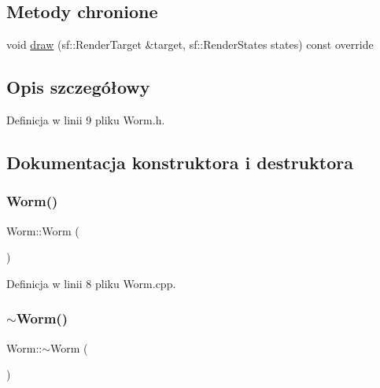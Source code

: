 \subsection*{Metody chronione}
\begin{DoxyCompactItemize}
\item 
void \mbox{\hyperlink{class_worm_adc9fd6dc3b770d4feada327666f31ee3}{draw}} (sf\+::\+Render\+Target \&target, sf\+::\+Render\+States states) const override
\end{DoxyCompactItemize}


\subsection{Opis szczegółowy}


Definicja w linii 9 pliku Worm.\+h.



\subsection{Dokumentacja konstruktora i destruktora}
\mbox{\label{class_worm_aaec23e2156f969303d6bfac36cae63e3}} 
\subsubsection{\texorpdfstring{Worm()}{Worm()}}
{\footnotesize\ttfamily Worm\+::\+Worm (\begin{DoxyParamCaption}{ }\end{DoxyParamCaption})}



Definicja w linii 8 pliku Worm.\+cpp.

\mbox{\label{class_worm_ade7672966c551bb91663ed03e06f297f}} 
\subsubsection{\texorpdfstring{$\sim$\+Worm()}{~Worm()}}
{\footnotesize\ttfamily Worm\+::$\sim$\+Worm (\begin{DoxyParamCaption}{ }\end{DoxyParamCaption})\hspace{0.3cm}{\ttfamily [virtual]}}




